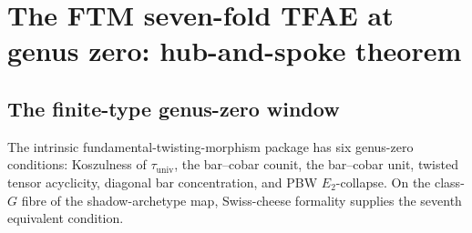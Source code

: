 
\chapter{The FTM seven-fold TFAE at genus zero: hub-and-spoke theorem}
\label{chap:ftm-seven-fold-tfae-platonic}

\section{The finite-type genus-zero window}
\label{sec:ftm-sevenfold-setup}

The intrinsic fundamental-twisting-morphism package has six
genus-zero conditions:
Koszulness of $\tau_{\mathrm{univ}}$, the bar--cobar counit,
the bar--cobar unit, twisted tensor acyclicity, diagonal bar
concentration, and PBW $E_2$-collapse.  On the class-$G$ fibre of the
shadow-archetype map, Swiss-cheese formality supplies the seventh
equivalent condition.

